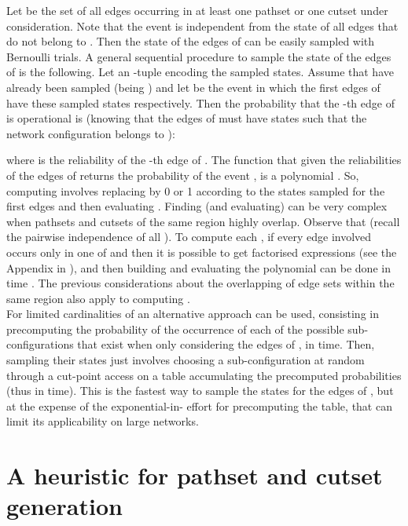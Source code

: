 \documentclass[a4paper]{article}
\begin{document}
Let  be the set of all edges occurring in at least one pathset or one  cutset under consideration. Note that the event  is independent from the state of all edges that do not belong to . Then the state of the edges of  can be easily sampled with  Bernoulli trials.
A general sequential procedure to sample the state of the edges of  is the following. Let  an -tuple encoding the sampled states. Assume that  have already been sampled (being ) and let  be the event in which the first  edges of  have these sampled states respectively. Then the probability that the -th edge of  is operational is (knowing that the edges of  must have states such that the network configuration belongs to ):



where  is the reliability of the -th edge of . The function that given the reliabilities  of the edges of  returns the probability of the event , is a polynomial . So, computing  involves replacing  by 0 or 1 according to the states sampled for the first  edges and then evaluating . Finding (and evaluating)  can be very complex when pathsets and cutsets of the same region highly overlap. Observe that  (recall the pairwise independence of all ). To compute each , if every edge involved occurs only in one of  and  then it is possible to get factorised expressions (see the Appendix in \cite{SartorCOMCOM2012}), and then building and evaluating the polynomial can be done in time . The previous considerations about the overlapping of edge sets within the same region also apply to computing . \\

For limited cardinalities of  an alternative approach can be used, consisting in precomputing the probability of the occurrence of each of the  possible sub-configurations that exist when only considering the edges of , in  time. Then, sampling their states just involves choosing a sub-configuration at random through a cut-point access on a table accumulating the precomputed probabilities (thus in  time). This is the fastest way to sample the states for the edges of , but at the expense of the exponential-in- effort for precomputing the table, that can limit its applicability on large networks.








\section{A heuristic for pathset and cutset generation}\label{s:heurisPatCut}
\end{document}
